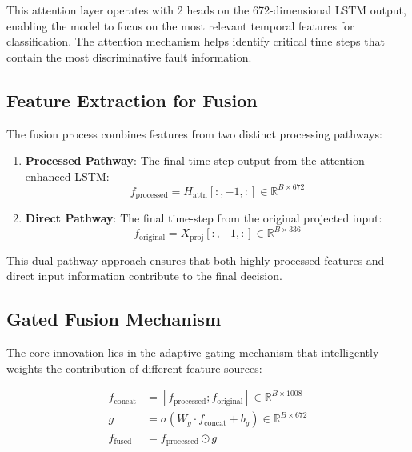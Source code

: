 This attention layer operates with 2 heads on the 672-dimensional LSTM output, enabling the model to focus on the most relevant temporal features for classification. The attention mechanism helps identify critical time steps that contain the most discriminative fault information.

\subsection{Feature Extraction for Fusion}
\label{subsec:feature_extraction_fusion}

The fusion process combines features from two distinct processing pathways:

\begin{enumerate}
    \item \textbf{Processed Pathway}: The final time-step output from the attention-enhanced LSTM:
    \begin{equation}
    f_{\text{processed}} = H_{\text{attn}}[:, -1, :] \in \mathbb{R}^{B \times 672}
    \end{equation}
    
    \item \textbf{Direct Pathway}: The final time-step from the original projected input:
    \begin{equation}
    f_{\text{original}} = X_{\text{proj}}[:, -1, :] \in \mathbb{R}^{B \times 336}
    \end{equation}
\end{enumerate}

This dual-pathway approach ensures that both highly processed features and direct input information contribute to the final decision.

\subsection{Gated Fusion Mechanism}
\label{subsec:gated_fusion}

The core innovation lies in the adaptive gating mechanism that intelligently weights the contribution of different feature sources:

\begin{align}
f_{\text{concat}} &= [f_{\text{processed}}; f_{\text{original}}] \in \mathbb{R}^{B \times 1008} \\
g &= \sigma(W_g \cdot f_{\text{concat}} + b_g) \in \mathbb{R}^{B \times 672} \\
f_{\text{fused}} &= f_{\text{processed}} \odot g
\end{align}

